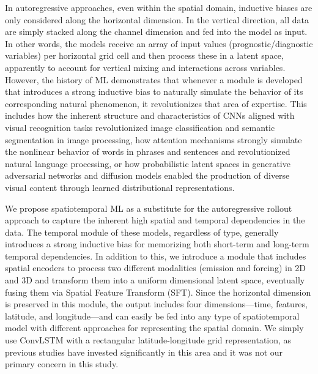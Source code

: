 \documentclass{article}
\begin{document}
    In autoregressive approaches, even within the spatial domain, inductive biases are only considered along the horizontal dimension. In the vertical direction, all data are simply stacked along the channel dimension and fed into the model as input. In other words, the models receive an array of input values (prognostic/diagnostic variables) per horizontal grid cell and then process these in a latent space, apparently to account for vertical mixing and interactions across variables. However, the history of ML demonstrates that whenever a module is developed that introduces a strong inductive bias to naturally simulate the behavior of its corresponding natural phenomenon, it revolutionizes that area of expertise. This includes how the inherent structure and characteristics of CNNs aligned with visual recognition tasks revolutionized image classification and semantic segmentation in image processing, how attention mechanisms strongly simulate the nonlinear behavior of words in phrases and sentences and revolutionized natural language processing, or how probabilistic latent spaces in generative adversarial networks and diffusion models enabled the production of diverse visual content through learned distributional representations.
    
    We propose spatiotemporal ML as a substitute for the autoregressive rollout approach to capture the inherent high spatial and temporal dependencies in the data. The temporal module of these models, regardless of type, generally introduces a strong inductive bias for memorizing both short-term and long-term temporal dependencies. In addition to this, we introduce a module that includes spatial encoders to process two different modalities (emission and forcing) in 2D and 3D and transform them into a uniform dimensional latent space, eventually fusing them via Spatial Feature Transform (SFT). Since the horizontal dimension is preserved in this module, the output includes four dimensions—time, features, latitude, and longitude—and can easily be fed into any type of spatiotemporal model with different approaches for representing the spatial domain. We simply use ConvLSTM with a rectangular latitude-longitude grid representation, as previous studies have invested significantly in this area and it was not our primary concern in this study.
\end{document}
